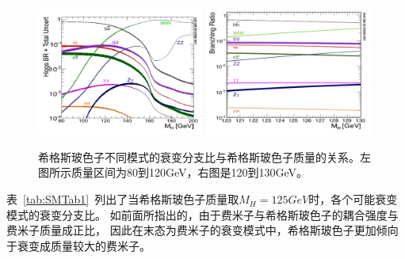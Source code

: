 \begin{figure}  
  \begin{center}
    \includegraphics[width=0.49\textwidth]{figuresTHE/SM4.jpg}
    \includegraphics[width=0.49\textwidth]{figuresTHE/SM5.jpg}
  \end{center}
  \caption{
希格斯玻色子不同模式的衰变分支比与希格斯玻色子质量的关系。左图所示质量区间为80到120GeV，右图是120到130GeV。
    }
  \label{fig:SM45}
\end{figure}

表~\ref{tab:SMTab1}~列出了当希格斯玻色子质量取$M_H=125GeV$时，各个可能衰变模式的衰变分支比。
如前面所指出的，由于费米子与希格斯玻色子的耦合强度与费米子质量成正比，
因此在末态为费米子的衰变模式中，希格斯玻色子更加倾向于衰变成质量较大的费米子。

